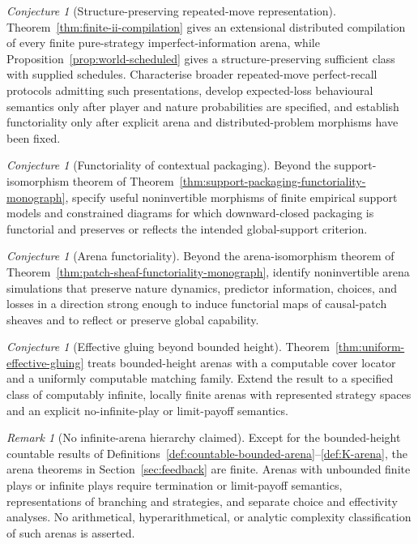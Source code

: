 \documentclass[11pt]{article}
\theoremstyle{plain}
\theoremstyle{definition}
\theoremstyle{remark}
\newtheorem{remark}[theorem]{Remark}
\newtheorem{conjecture}[theorem]{Conjecture}
\begin{document}
\begin{conjecture}[Structure-preserving repeated-move representation]
\label{conj:imperfect}
Theorem~\ref{thm:finite-ii-compilation} gives an extensional distributed
compilation of every finite pure-strategy imperfect-information arena, while
Proposition~\ref{prop:world-scheduled} gives a structure-preserving sufficient
class with supplied schedules. Characterise broader repeated-move perfect-recall
protocols admitting such presentations, develop expected-loss behavioural
semantics only after player and nature probabilities are specified, and
establish functoriality only after explicit arena and distributed-problem
morphisms have been fixed.
\end{conjecture}

\begin{conjecture}[Functoriality of contextual packaging]\label{conj:context}
Beyond the support-isomorphism theorem of
Theorem~\ref{thm:support-packaging-functoriality-monograph}, specify useful
noninvertible morphisms of finite empirical support models and constrained
diagrams for which downward-closed packaging is functorial and preserves or
reflects the intended global-support criterion.
\end{conjecture}

\begin{conjecture}[Arena functoriality]\label{conj:arena-functor}
Beyond the arena-isomorphism theorem of
Theorem~\ref{thm:patch-sheaf-functoriality-monograph}, identify noninvertible
arena simulations that preserve nature dynamics, predictor information, choices,
and losses in a direction strong enough to induce functorial maps of causal-patch
sheaves and to reflect or preserve global capability.
\end{conjecture}

\begin{conjecture}[Effective gluing beyond bounded height]
\label{conj:effective-gluing}
Theorem~\ref{thm:uniform-effective-gluing} treats bounded-height arenas with a
computable cover locator and a uniformly computable matching family. Extend the
result to a specified class of computably infinite, locally finite arenas with
represented strategy spaces and an explicit no-infinite-play or limit-payoff
semantics.
\end{conjecture}

\begin{remark}[No infinite-arena hierarchy claimed]
Except for the bounded-height countable results of
Definitions~\ref{def:countable-bounded-arena}--\ref{def:K-arena}, the arena
theorems in Section~\ref{sec:feedback} are finite. Arenas with unbounded finite
plays or infinite plays require termination or limit-payoff semantics,
representations of branching and strategies, and separate choice and
effectivity analyses. No arithmetical, hyperarithmetical, or analytic complexity
classification of such arenas is asserted.
\end{remark}
\end{document}
